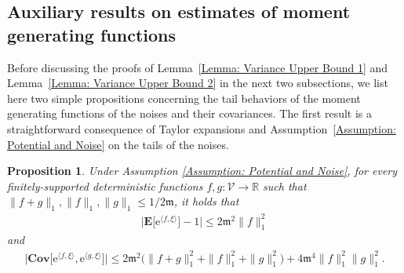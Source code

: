 \documentclass{amsart}
\numberwithin{equation}{section}
\newtheorem{proposition}[theorem]{Proposition}
\theoremstyle{definition}
\newcommand\mbb{\mathbb}
\newcommand\mbf{\mathbf}
\newcommand\mf{\mathfrak}
\newcommand\mr{\mathrm}
\newcommand\ms{\mathscr}
\begin{document}
\subsection{Auxiliary results on estimates of moment generating functions} 
\label{Section: Moment Generating Functions}
Before discussing the proofs of Lemma~\ref{Lemma: Variance Upper Bound 1} and Lemma~\ref{Lemma: Variance Upper Bound 2} in the next two subsections, we list here two simple propositions concerning the tail behaviors of the moment generating functions of the noises and their covariances. The first result is a  straightforward consequence of Taylor expansions and Assumption~\ref{Assumption: Potential and Noise} on the tails of the noises. 
\begin{proposition}
	\label{Proposition: Noise Decay 1}
	Under Assumption \ref{Assumption: Potential and Noise},
	for every finitely-supported deterministic functions $f,g:\ms V\to\mbb R$ such that
	$\|f+g\|_{1},\|f\|_{1},\|g\|_{1}\leq1/2\mf m$,
	it holds that
	\begin{align}\label{eq: NoiseDecay1}
		\Big|\mbf E\big[\mr e^{\langle f,\xi\rangle}\big]-1\Big|\leq 2\mf m^2\|f\|_{1}^2
	\end{align}
	and
	\begin{align}\label{eq: NoiseDecay2}
		\big|\mbf{Cov}\big[\mr e^{\langle f,\xi\rangle},\mr e^{\langle g,\xi\rangle}\big]\Big|\leq2\mf m^2\big(\|f+g\|_{1}^2+\|f\|_{1}^2+\|g\|^2_{1}\big)+4\mf m^4\|f\|_{1}^2\|g\|_{1}^2.
	\end{align}
\end{proposition}
\end{document}
